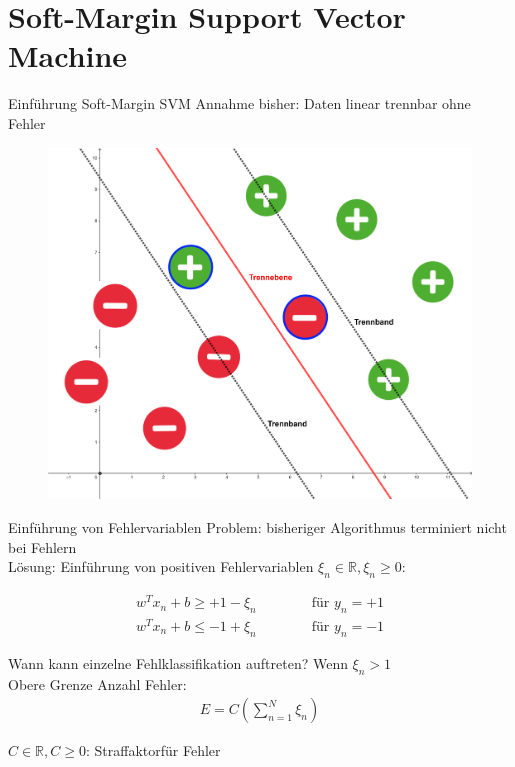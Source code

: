 \documentclass[ngerman]{beamer}
\begin{document}
\section{Soft-Margin Support Vector Machine}

\begin{frame}{Einführung Soft-Margin SVM}
	Annahme bisher: Daten linear trennbar ohne Fehler \\
	
	\begin{center}
		\begin{figure}
			\includegraphics[width=\textwidth,height=0.7\textheight,keepaspectratio]{assets/soft_margin_example.png}
		\end{figure}
	\end{center}
\end{frame}

\begin{frame}{Einführung von Fehlervariablen}
	Problem: bisheriger Algorithmus terminiert nicht bei Fehlern \\
	Lösung: Einführung von positiven Fehlervariablen $\xi_{n} \in \mathbb{R}, \xi_{n} \geq 0$:
	
	\begin{subequations}
		\begin{alignat*}{2}
			w^{T} x_{n} + b \geq +1 - \xi_{n}& \qquad & \text{ für } y_{n} = +1\\
			w^{T} x_{n} + b \leq -1 + \xi_{n}& & \text{ für } y_{n} = -1
		\end{alignat*}
	\end{subequations}

	Wann kann einzelne Fehlklassifikation auftreten? Wenn $\xi_{n} > 1$ \\
	
	Obere Grenze Anzahl Fehler:
	\begin{equation*}
		\begin{aligned}
			E = C(\sum_{n=1}^{N} \xi_{n})
		\end{aligned}
	\end{equation*}

	$C \in \mathbb{R}, C \geq 0$: \glqq Straffaktor\grqq für Fehler
\end{frame}
\end{document}
